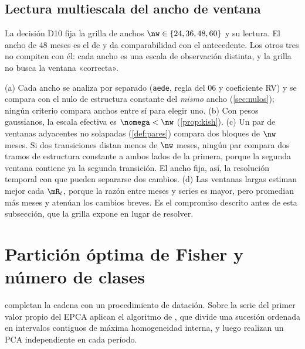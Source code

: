 \subsection{Lectura multiescala del ancho de ventana}
\label{sec:multiescala}

La decisión D10 fija la grilla de anchos $\nw\in\{24, 36, 48, 60\}$ y su lectura. El ancho de 48 meses
es el de \textcite{camiz_cerda_atoche_2026} y da comparabilidad con el antecedente. Los otros tres
no compiten con él: cada ancho es una escala de observación distinta, y la grilla no busca la
ventana «correcta».

\begin{observacion}\label{obs:multiescala}
(a) Cada ancho se analiza por separado (\texttt{aede}, regla del 06 y coeficiente RV) y se compara
con el nulo de estructura constante del \emph{mismo} ancho (\cref{sec:nulos}); ningún criterio
compara anchos entre sí para elegir uno. (b) Con pesos gaussianos, la escala efectiva es
$\nomega<\nw$ (\cref{prop:kish}). (c) Un par de ventanas adyacentes no solapadas
(\cref{def:pares}) compara dos bloques de $\nw$ meses. Si dos transiciones distan menos de $\nw$
meses, ningún par compara dos tramos de estructura constante a ambos lados de la primera, porque
la segunda ventana contiene ya la segunda transición. El ancho fija, así, la resolución temporal
con que pueden separarse dos cambios. (d) Las ventanas largas estiman mejor cada $\mR_t$, porque
la razón entre meses y series es mayor, pero promedian más meses y atenúan los cambios breves.
Es el compromiso descrito antes de esta subsección, que la grilla expone en lugar de resolver.
\end{observacion}

\section{Partición óptima de Fisher y número de clases}
\label{sec:fisher}

\textcite{camiz_roig_2011} completan la cadena con un procedimiento de datación. Sobre la serie del
primer valor propio del EPCA aplican el algoritmo de \textcite{fisher_1958}, que divide una
sucesión ordenada en intervalos contiguos de máxima homogeneidad interna, y luego realizan un PCA
independiente en cada período.


